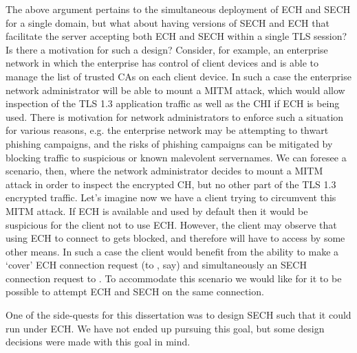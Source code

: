 The above argument pertains to the simultaneous
deployment of \ac{ECH} and \ac{SECH} for a single domain,
but what about having versions of \ac{SECH} and \ac{ECH}
that facilitate the server accepting both \ac{ECH} and \ac{SECH} within a single TLS session?
Is there a motivation for such a design?
Consider, for example, an enterprise network in which the enterprise has control of client devices and is able to manage the list of trusted \ac{CA}s on each client device.
In such a case the enterprise network administrator will be able to mount a \ac{MITM} attack,
which would allow inspection of the TLS 1.3 application traffic as well as the \ac{CHI} if \ac{ECH} is being used.
There is motivation for network administrators to enforce such a situation for various reasons,
e.g. the enterprise network may be attempting to thwart phishing campaigns, and the risks of phishing campaigns can be mitigated by blocking traffic to suspicious or known malevolent servernames.
We can foresee a scenario, then,
where the network administrator decides to mount a \ac{MITM} attack in order to inspect the encrypted \ac{CH},
but no other part of the \ac{TLS} 1.3 encrypted traffic.
Let's imagine now we have a client trying to circumvent this \ac{MITM} attack.
If \ac{ECH} is available and used by default then it would be suspicious for the client not to use \ac{ECH}. However, the client may observe that using \ac{ECH}
to connect to  gets blocked,
and therefore will have to access  by some other means.
In such a case the client would benefit from the ability to make a `cover' \ac{ECH} connection request (to , say)
and simultaneously an \ac{SECH} connection request to .
To accommodate this scenario we would like for it to be possible to attempt \ac{ECH} and \ac{SECH} on the same connection.

One of the side-quests for this dissertation was to design \ac{SECH} such that it could run under \ac{ECH}.
We have not ended up pursuing this goal,
but some design decisions were made with
this goal in mind.


